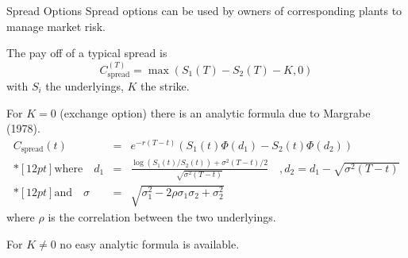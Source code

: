 Spread Options
	Spread options can be used by owners of corresponding plants to
	manage market risk.

	The pay off of a typical spread is
	$$C_{\mbox{spread}}^{(T)}=\max(S_1(T)-S_2(T)-K,0)$$ with $S_i$ the
	underlyings, $K$ the strike.

	For $K=0$ (exchange option) there is an analytic formula due to
	Margrabe (1978).
	$$\begin{array}{lll}
	 C_{\mbox{spread}}(t) & = & e^{-r(T-t)}(S_1(t)\Phi(d_1)-S_2(t)\Phi(d_2))
	 \\*[12pt]
	 \mbox{where}\quad d_1 & = & \frac{\log(S_1(t)/S_2(t))+\sigma^{2}(T-t)/2}{\sqrt{\sigma^{2}(T-t)}}\quad ,d_2=d_1-\sqrt{\sigma^{2}(T-t)}
	 \\*[12pt]
	 \mbox{and}\quad \sigma & = & \sqrt{\sigma_1^2-2\rho\sigma_1\sigma_2+\sigma_2^2}
	\end{array}$$
	where $\rho$ is the correlation between the two underlyings.

	For $K\neq 0$ no easy analytic formula is available.

